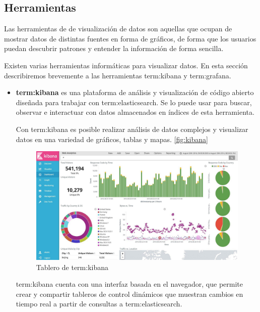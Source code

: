 \subsection{Herramientas}
\label{herramientas-de-visualizacion}

Las herramientas de  de visualización de datos son aquellas que ocupan
de mostrar datos de distintas fuentes en forma de gráficos, de forma que los
usuarios puedan descubrir patrones y entender la información de forma sencilla.

Existen varias herramientas informáticas para visualizar datos. En esta sección
describiremos brevemente a las herramientas \gls{term:kibana} y
\gls{term:grafana}.

\begin{itemize}

\item
\textbf{\gls{term:kibana}} es una plataforma de análisis y visualización de código
abierto diseñada para trabajar con \gls{term:elasticsearch}. Se lo puede usar
para buscar, observar e interactuar con datos almacenados en índices de esta herramienta.

Con \gls{term:kibana} es posible realizar análisis de datos complejos y
visualizar datos en una variedad de gráficos, tablas y mapas.
\autoref{fig:kibana}

\begin{figure}
  \includegraphics[width=\linewidth]{src/images/05-capitulo-5/kibana.jpg}
  \caption{Tablero de \gls{term:kibana}}
  \label{fig:kibana}
\end{figure}

\gls{term:kibana} cuenta con una interfaz basada en el navegador, que permite
crear y compartir tableros de control dinámicos que muestran cambios en tiempo real
a partir de consultas a \gls{term:elasticsearch}.


\end{itemize}
